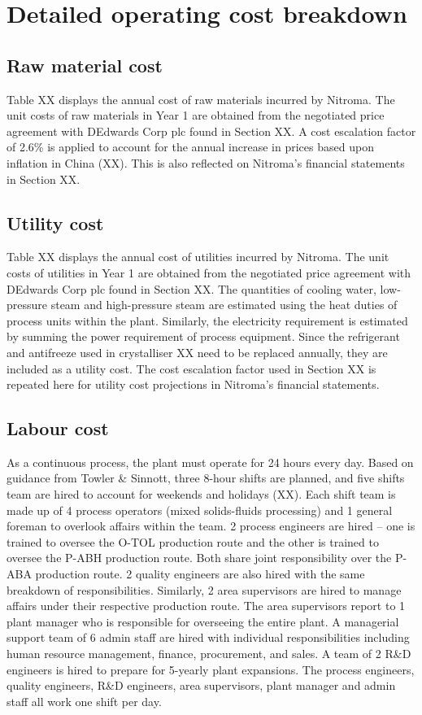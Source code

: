 \section{Detailed operating cost breakdown}
\subsection{Raw material cost}
Table XX displays the annual cost of raw materials incurred by Nitroma. The unit costs of raw materials in Year 1 are obtained from the negotiated price agreement with DEdwards Corp plc found in Section XX. A cost escalation factor of 2.6\% is applied to account for the annual increase in prices based upon inflation in China (XX). This is also reflected on Nitroma’s financial statements in Section XX.

\subsection{Utility cost}
Table XX displays the annual cost of utilities incurred by Nitroma. The unit costs of utilities in Year 1 are obtained from the negotiated price agreement with DEdwards Corp plc found in Section XX. The quantities of cooling water, low-pressure steam and high-pressure steam are estimated using the heat duties of process units within the plant. Similarly, the electricity requirement is estimated by summing the power requirement of process equipment. Since the refrigerant and antifreeze used in crystalliser XX need to be replaced annually, they are included as a utility cost. The cost escalation factor used in Section XX is repeated here for utility cost projections in Nitroma’s financial statements.  

\subsection{Labour cost}
As a continuous process, the plant must operate for 24 hours every day. Based on guidance from Towler \& Sinnott, three 8-hour shifts are planned, and five shifts team are hired to account for weekends and holidays (XX). Each shift team is made up of 4 process operators (mixed solids-fluids processing) and 1 general foreman to overlook affairs within the team. 2 process engineers are hired – one is trained to oversee the O-TOL production route and the other is trained to oversee the P-ABH production route. Both share joint responsibility over the P-ABA production route. 2 quality engineers are also hired with the same breakdown of responsibilities.  Similarly, 2 area supervisors are hired to manage affairs under their respective production route. The area supervisors report to 1 plant manager who is responsible for overseeing the entire plant. A managerial support team of 6 admin staff are hired with individual responsibilities including human resource management, finance, procurement, and sales. A team of 2 R&D engineers is hired to prepare for 5-yearly plant expansions. The process engineers, quality engineers, R\&D engineers, area supervisors, plant manager and admin staff all work one shift per day.

